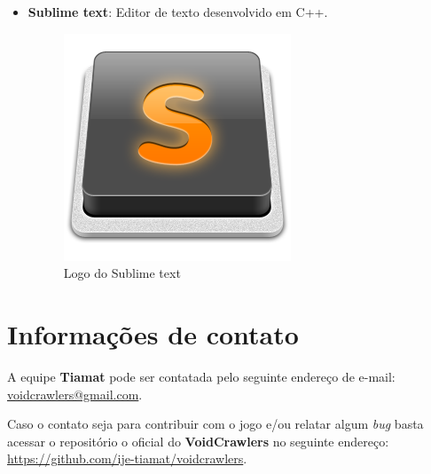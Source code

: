 \documentclass[11pt]{article} %
\begin{document}
\begin{itemize}
\item \textbf{Sublime text}: Editor de texto desenvolvido em C++.

\begin{figure}[!htp]
\centering
\includegraphics[scale=0.3]{imagens/Sublime_Text_Logo.png}
\caption{Logo do Sublime text}
\label{Sublime text}
\end{figure}

\end{itemize}

\section*{Informações de contato}
A equipe \textbf{Tiamat} pode ser contatada pelo seguinte endereço de e-mail: \url{voidcrawlers@gmail.com}.

Caso o contato seja para contribuir com o jogo e/ou relatar algum \textit{bug} basta acessar o repositório o oficial do \textbf{VoidCrawlers} no seguinte endereço: \url{https://github.com/ije-tiamat/voidcrawlers}.
\end{document}
